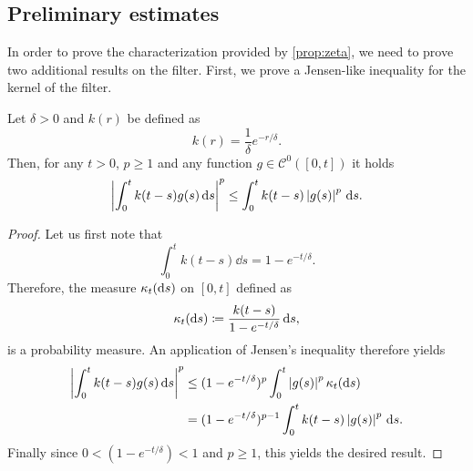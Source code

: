 \documentclass[review,onefignum,onetabnum]{siamonline190516}
\begin{document}
\begin{appendices}
\subsection{Preliminary estimates}
In order to prove the characterization provided by \cref{prop:zeta}, we need to prove two additional results on the filter. First, we prove a Jensen-like inequality for the kernel of the filter.

\begin{lemma}\label{lem:FilterJensen} Let $\delta > 0$ and $k(r)$ be defined as
	\begin{equation}
		k(r) = \frac1\delta e^{-r/\delta}.
	\end{equation}
	Then, for any $t > 0$, $p \geq 1$ and any function $g\in \mathcal C^0([0, t])$ it holds 
		\begin{equation}
			\left\lvert\int_0^t k(t-s) g(s) \,\mathrm{d} s\right\rvert^p \leq \int_0^t k(t-s) \left\lvert g(s)\right\rvert^p \,\mathrm{d} s.
		\end{equation}
\end{lemma}
\begin{proof} Let us first note that
	\begin{equation}
		\int_0^t k(t-s) \dd s = 1 - e^{-t/\delta}.
	\end{equation}
	Therefore, the measure $\kappa_t(\mathrm{d} s)$ on $[0, t]$ defined as
	\begin{equation}
		\kappa_t(\mathrm{d} s) \coloneqq \frac{k(t-s)}{1 - e^{-t/\delta}} \,\mathrm{d} s,
	\end{equation}
	is a probability measure. An application of Jensen's inequality therefore yields
	\begin{equation}
	\begin{aligned}
		\left\lvert\int_0^t k(t-s) g(s) \,\mathrm{d} s\right\rvert^p &\leq (1 - e^{-t/\delta})^p \int_0^t \left\lvert g(s)\right\rvert^p \kappa_t(\mathrm{d} s) \\
		&= (1 - e^{-t/\delta})^{p-1} \int_0^t k(t-s) \left\lvert g(s)\right\rvert^p \,\mathrm{d} s.
	\end{aligned}
	\end{equation}
	Finally since $0 < (1 - e^{-t/\delta})< 1$ and $p \geq 1$, this yields the desired result.
\end{proof}


\end{appendices}
\end{document}
